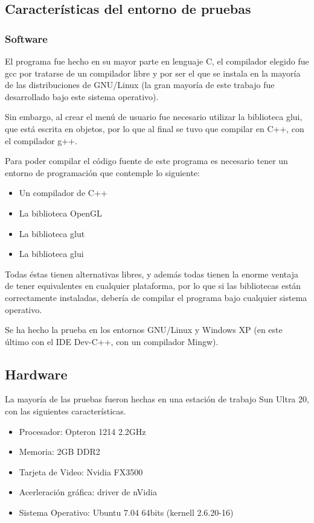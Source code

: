 \subsection{Características del entorno de pruebas}

\subsubsection{Software}

El programa fue hecho en su mayor parte en lenguaje C, el compilador elegido fue gcc por tratarse de un compilador libre y por ser el que se instala en la mayoría de las distribuciones de GNU/Linux (la gran mayoría de este trabajo fue desarrollado bajo este sistema operativo).

Sin embargo, al crear el menú de usuario fue necesario utilizar la biblioteca glui, que está escrita en objetos, por lo que al final se tuvo que compilar en C++, con el compilador g++.

Para poder compilar el código fuente de este programa es necesario tener un entorno de programación que contemple lo siguiente:

\begin{itemize}
 \item Un compilador de C++
 \item La biblioteca OpenGL
 \item La biblioteca glut
 \item La biblioteca glui
\end{itemize}

Todas éstas tienen alternativas libres, y además todas tienen la enorme ventaja de tener equivalentes en cualquier plataforma, por lo que si las bibliotecas están correctamente instaladas, debería de compilar el programa bajo cualquier sistema operativo.

Se ha hecho la prueba en los entornos GNU/Linux y Windows XP (en este último con el IDE Dev-C++, con un compilador Mingw).

\subsection{Hardware}
La mayoría de las pruebas fueron hechas en una estación de trabajo Sun Ultra 20, con las siguientes características.

\begin{itemize}
\label{maquina:trabajo} 
 \item Procesador: Opteron 1214 2.2GHz
 \item Memoria: 2GB DDR2
 \item Tarjeta de Video: Nvidia FX3500
 \item Acerleración gráfica: driver de nVidia
 \item Sistema Operativo: Ubuntu 7.04 64bits (kernell 2.6.20-16)
\end{itemize}


